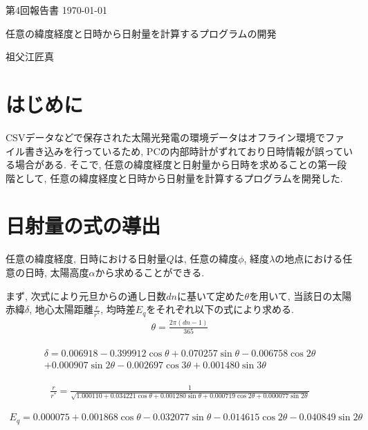 \documentclass[a4j,12pt,]{jarticle}
\begin{document}
{\noindent\small 第4回報告書 \hfill\today}
\begin{center}
  {\Large 任意の緯度経度と日時から日射量を計算するプログラムの開発}
\end{center}
\begin{flushright}
  祖父江匠真 \\
\end{flushright}

\section{はじめに}
CSVデータなどで保存された太陽光発電の環境データはオフライン環境でファイル書き込みを行っているため, PCの内部時計がずれており日時情報が誤っている場合がある.
そこで, 任意の緯度経度と日射量から日時を求めることの第一段階として, 任意の緯度経度と日時から日射量を計算するプログラムを開発した.

\section{日射量の式の導出}
任意の緯度経度, 日時における日射量$Q$は, 任意の緯度$\phi$, 経度$\lambda$の地点における任意の日時, 太陽高度$\alpha$から求めることができる.

まず, 次式により元旦からの通し日数$dn$に基いて定めた$\theta$を用いて, 当該日の太陽赤緯$\delta$, 地心太陽距離$\frac{r}{r^{*}}$, 均時差$E_q$をそれぞれ以下の式により求める.
\begin{eqnarray}
  \theta =  \frac{2\pi (dn-1)}{365}
\end{eqnarray}

\begin{eqnarray}
\begin{split}
  \delta =  0.006918-0.399912\cos \theta+0.070257\sin \theta-0.006758\cos 2\theta\\
  +0.000907\sin 2\theta-0.002697\cos 3\theta+0.001480\sin 3\theta
\end{split}
\end{eqnarray}

\begin{eqnarray}
  \frac{r}{r^{*}} =  \frac{1}{\sqrt{1.000110+0.034221\cos \theta+0.001280\sin \theta+0.000719\cos 2\theta+0.000077\sin 2\theta}}
\end{eqnarray}

\begin{eqnarray}
  E_q =  0.000075+0.001868\cos \theta-0.032077\sin \theta-0.014615\cos 2\theta-0.040849\sin 2\theta
\end{eqnarray}
\end{document}
